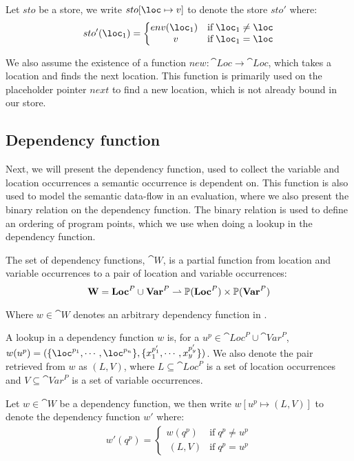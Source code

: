 \documentclass[../../master.tex]{subfiles}
\begin{document}
\begin{definition}
	Let $sto$ be a store, we write $sto[\loc\mapsto v]$ to denote the store $sto'$ where:
	\begin{align*}
		sto'(\loc_1)=
		\left\{\begin{matrix}
			env(\loc_1) & \mbox{if}\;\loc_1\neq \loc\\\	 
			v & \mbox{if}\;\loc_1=\loc
		\end{matrix}\right.
	\end{align*}
\end{definition}

We also assume the existence of a function $new:\cat{Loc}\rightarrow\cat{Loc}$, which takes a location and finds the next location.
This function is primarily used on the placeholder pointer $next$ to find a new location, which is not already bound in our store.



\subsection{Dependency function}\label{sec:DepFunc}
Next, we will present the dependency function, used to collect the variable and location occurrences a semantic occurrence is dependent on.
This function is also used to model the semantic data-flow in an evaluation, where we also present the binary relation on the dependency function.
The binary relation is used to define an ordering of program points, which we use when doing a lookup in the dependency function.

\begin{definition}\label{def:DepFunc}
	The set of dependency functions, $\cat{W}$, is a partial function from location and variable occurrences to a pair of location and variable occurrences:
	$$\textbf{W}=\textbf{Loc}^P\cup\textbf{Var}^P\rightharpoonup\mathbb{P}(\textbf{Loc}^P)\times\mathbb{P}(\textbf{Var}^P)$$
\end{definition}
Where $w\in{}$ denotes an arbitrary dependency function in \cat{W}.

A lookup in a dependency function $w$ is, for a $u^p\in\cat{Loc}^P\cup\cat{Var}^P$, $w(u^p)=(\{\loc^{p_1},\cdots,\loc^{p_n}\},\{x_1^{p'_1},\cdots,x_y^{p'_y}\})$.
We also denote the pair retrieved from $w$ as $(L,V)$, where $L\subseteq\cat{Loc}^P$ is a set of location occurrences and $V\subseteq\cat{Var}^P$ is a set of variable occurrences.

\begin{definition}[Extension of $w$]\label{def:DepExt}
	Let $w\in\cat{W}$ be a dependency function, we then write $w[u^p\mapsto(L,V)]$ to denote the dependency function $w'$ where:
	\begin{align*}
		w'(q^p)=
		\left\{\begin{matrix}
			w(q^p) & \mbox{if}\;q^p\neq u^p\\\	 
			(L,V) & \mbox{if}\;q^p=u^p
		\end{matrix}\right.
	\end{align*}
\end{definition}
\end{document}
